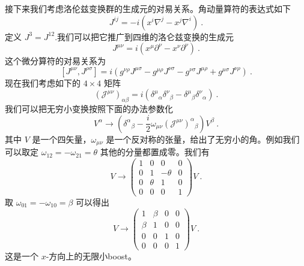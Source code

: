 接下来我们考虑洛伦兹变换群的生成元的对易关系。角动量算符的表达式如下
\begin{equation}
J^{ij} = -i (x^i\nabla^j- x^j\nabla^i)~.
\end{equation}
定义 $J^3 = J^{12}$.我们可以把它推广到四维的洛仑兹变换的生成元
\begin{equation}
J^{\mu\nu} = i (x^\mu \partial^\nu - x^\nu \partial^\nu)~.
\end{equation}
这个微分算符的对易关系为
\begin{equation}\label{eq_Dirac_4}
[J^{\mu\nu},J^{\rho\sigma}] = i (g^{\nu\rho}J^{\mu\sigma} - g^{\mu\rho}J^{\nu\sigma}-g^{\nu\sigma}J^{\mu\rho}+g^{\mu\sigma}J^{\nu\rho})~.
\end{equation}
现在我们考虑如下的 $4\times 4$ 矩阵
\begin{equation}
(\mathcal J^{\mu\nu})_{\alpha\beta} = i (\delta^\mu{}_\alpha \delta^\nu{}_\beta - \delta^\mu{}_\beta \delta^\nu{}_\alpha)~.
\end{equation}
我们可以把无穷小变换按照下面的办法参数化
\begin{equation}
V^\alpha \rightarrow (\delta^\alpha{}_\beta - \frac{i}{2}\omega_{\mu\nu}(\mathcal J^{\mu\nu})^\alpha{}_\beta) V^\beta ~.
\end{equation}
其中 $V$ 是一个四矢量，$\omega_{\mu\nu}$ 是一个反对称的张量，给出了无穷小的角。例如我们可以取定 $\omega_{12}=-\omega_{21} = \theta$ 其他的分量都置成零。我们有
\begin{equation}
V \rightarrow \begin{pmatrix}
1 & 0 & 0 & 0 \\
0 & 1 & -\theta & 0 \\
0 & \theta & 1 & 0 \\
0 & 0 & 0 & 1
\end{pmatrix}
V~.
\end{equation}
取 $\omega_{01} = -\omega_{10}=\beta$ 可以得出
\begin{equation}
V \rightarrow \begin{pmatrix}
1 & \beta & 0 & 0 \\
\beta & 1 & 0 & 0 \\
0 & 0 & 1 & 0 \\
0 & 0 & 0 & 1
\end{pmatrix}
V~.
\end{equation}
这是一个 $x$-方向上的无限小boost。

